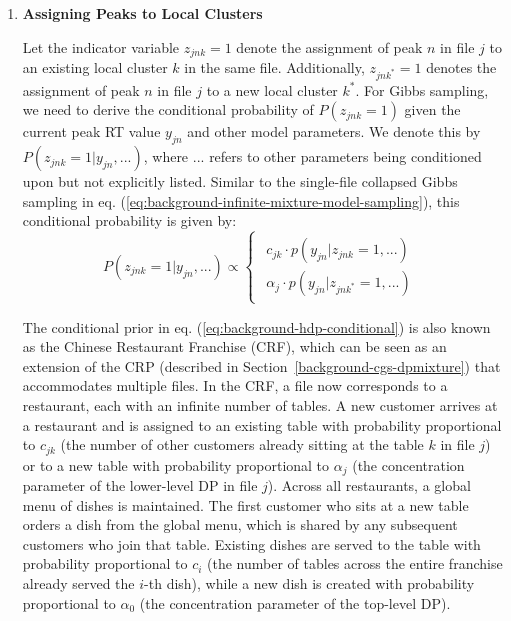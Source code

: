 \begin{enumerate}

\item \textbf{Assigning Peaks to Local Clusters}

Let the indicator variable $z_{jnk}=1$ denote the assignment of peak $n$ in file $j$ to an existing local cluster $k$ in the same file. Additionally, $z_{jnk^{*}}=1$ denotes the assignment of peak $n$ in file $j$ to a new local cluster $k^{*}$. For Gibbs sampling, we need to derive the conditional probability of $P(z_{jnk}=1)$ given the current peak RT value $y_{jn}$ and other model parameters. We denote this by $P(z_{jnk}=1 \vert y_{jn}, ...)$, where $...$ refers to other parameters being conditioned upon but not explicitly listed. Similar to the single-file collapsed Gibbs sampling in eq. (\ref{eq:background-infinite-mixture-model-sampling}), this conditional probability is given by:
\begin{dmath}
P(z_{jnk}=1 \vert y_{jn}, ...)\propto\begin{cases}
\begin{array}{c}
c_{jk}\cdot p(y_{jn} \vert z_{jnk}=1,...)\\
\alpha_{j}\cdot p(y_{jn} \vert z_{jnk^{*}}=1,...)
\end{array}\end{cases}\label{eq:background-hdp-conditional}
\end{dmath}

The conditional prior in eq. (\ref{eq:background-hdp-conditional}) is also known as the Chinese Restaurant Franchise (CRF), which can be seen as an extension of the CRP (described in Section~\ref{background-cgs-dpmixture}) that accommodates multiple files. In the CRF, a file now corresponds to a restaurant, each with an infinite number of tables. A new customer arrives at a restaurant and is assigned to an existing table with probability proportional to $c_{jk}$ (the number of other customers already sitting at the table $k$ in file $j$) or to a new table with probability proportional to $\alpha_j$ (the concentration parameter of the lower-level DP in file $j$). Across all restaurants, a global menu of dishes is maintained. The first customer who sits at a new table orders a dish from the global menu, which is shared by any subsequent customers who join that table. Existing dishes are served to the table with probability proportional to $c_i$ (the number of tables across the entire franchise already served the $i$-th dish), while a new dish is created with probability proportional to $\alpha_0$ (the concentration parameter of the top-level DP).


\end{enumerate}
